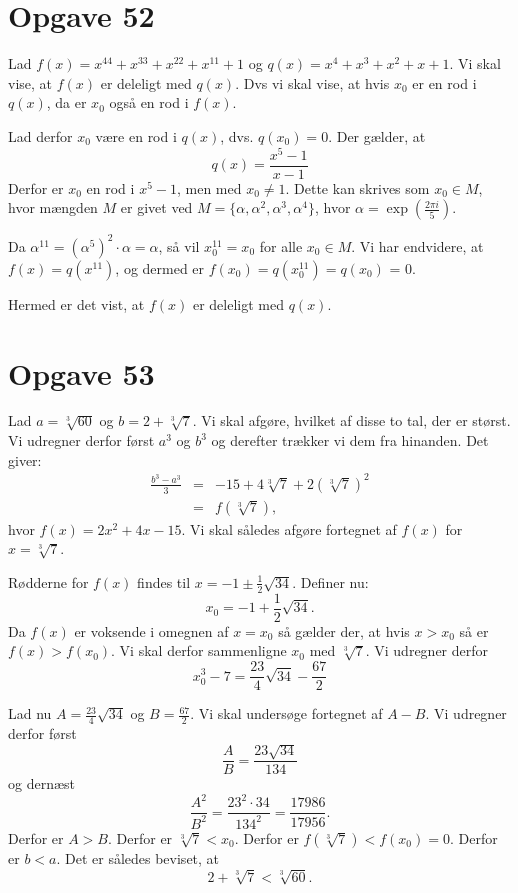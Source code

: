 \documentclass[12pt,oneside,a4paper]{article}
\newcommand{\bas}{\begin{eqnarray*}}
\newcommand{\eas}{\end{eqnarray*}}
\begin{document}
\section*{Opgave 52}
Lad $f(x) = x^{44} + x^{33} + x^{22} + x^{11} + 1$ og $q(x) = x^4 + x^3 + x^2 +
x + 1$.  Vi skal vise, at $f(x)$ er deleligt med $q(x)$. Dvs vi skal vise, at
hvis $x_0$ er en rod i $q(x)$, da er $x_0$ også en rod i $f(x)$.

Lad derfor $x_0$ være en rod i $q(x)$, dvs. $q(x_0)=0$. 
Der gælder, at
$$
q(x) = \frac{x^5-1}{x-1}
$$
Derfor er $x_0$ en rod i $x^5-1$, men med $x_0 \neq 1$.
Dette kan skrives som $x_0\in M$, hvor
mængden $M$ er givet ved $M = \{\alpha, \alpha^2, \alpha^3, \alpha^4\}$, hvor
$\alpha=\exp\left(\frac{2\pi i}{5}\right)$.

Da $\alpha^{11} = \left(\alpha^5\right)^2 \cdot \alpha = \alpha$, så vil 
$x_0^{11} = x_0$ for alle $x_0\in M$.
Vi har endvidere, at $f(x) = q(x^{11})$, og dermed er $f(x_0) = q(x_0^{11}) =
q(x_0)$ = 0.

Hermed er det vist, at $f(x)$ er deleligt med $q(x)$.

\section*{Opgave 53}
Lad $a = \sqrt[3]{60}$ og $b=2 + \sqrt[3]{7}$. Vi skal afgøre, hvilket af disse
to tal, der er størst.  Vi udregner derfor først $a^3$ og $b^3$ og derefter
trækker vi dem fra hinanden. Det giver:
\bas
\frac{b^3-a^3}{3} &=& -15 + 4\sqrt[3]{7} + 2 \left(\sqrt[3]{7}\right)^2 \\
                  &=& f\left(\sqrt[3]{7}\right),
\eas
hvor $f(x) = 2x^2+4x-15$. Vi skal således afgøre fortegnet af $f(x)$ for $x =
\sqrt[3]{7}$.

Rødderne for $f(x)$ findes til $x = -1 \pm \frac12 \sqrt{34}$. Definer nu:
$$
x_0 = -1 + \frac12\sqrt{34}.
$$
Da $f(x)$ er voksende i omegnen af $x=x_0$ så gælder der, at hvis $x>x_0$ så
er $f(x) > f(x_0)$. Vi skal derfor sammenligne $x_0$ med $\sqrt[3]{7}$.
Vi udregner derfor
$$
x_0^3-7 = \frac{23}{4}\sqrt{34} - \frac{67}{2}
$$

Lad nu $A = \frac{23}{4}\sqrt{34}$ og $B = \frac{67}{2}$. Vi skal undersøge fortegnet af $A-B$. Vi udregner derfor først
$$
\frac{A}{B} = \frac{23\sqrt{34}}{134}
$$
og dernæst
$$
\frac{A^2}{B^2} = \frac{23^2 \cdot 34}{134^2} = \frac{17986}{17956}.
$$
Derfor er $A > B$. Derfor er $\sqrt[3]{7} < x_0$. Derfor er
$f\left(\sqrt[3]{7}\right) < f(x_0) = 0$. Derfor er $b < a$. Det er således beviset, at
$$
2 + \sqrt[3]{7} < \sqrt[3]{60}.
$$
\end{document}
